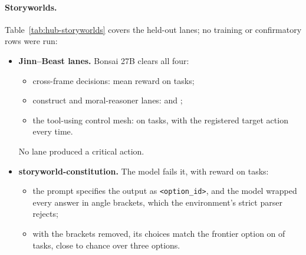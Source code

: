 \paragraph{Storyworlds.}
Table~\ref{tab:hub-storyworlds} covers the held-out lanes; no training or confirmatory rows were run:
\begin{itemize}
\item \textbf{Jinn--Beast lanes.} Bonsai 27B clears all four:
  \begin{itemize}
  \item cross-frame decisions: mean reward \HubJbmCrossDevEightZeroMean{} on \HubJbmCrossDevEightZeroN{} tasks;
  \item construct and moral-reasoner lanes: \HubJbmConstructsDevMean{} and \HubJbmReasonerDevMean{};
  \item the tool-using control mesh: \HubJbmMeshTwoDevMean{} on \HubJbmMeshTwoDevN{} tasks, with the registered target
  action every time.
  \end{itemize}
  No lane produced a critical action.
\item \textbf{storyworld-constitution.} The model fails it, with reward \HubSwConstitutionEvalMean{} on
\HubSwConstitutionEvalN{} tasks:
  \begin{itemize}
  \item the prompt specifies the output as \texttt{<option\_id>}, and the model wrapped every answer in angle brackets,
  which the environment's strict parser rejects;
  \item with the brackets removed, its choices match the frontier option on \HubSwcBracket{} of tasks, close to chance
  over three options.
  \end{itemize}
\end{itemize}

